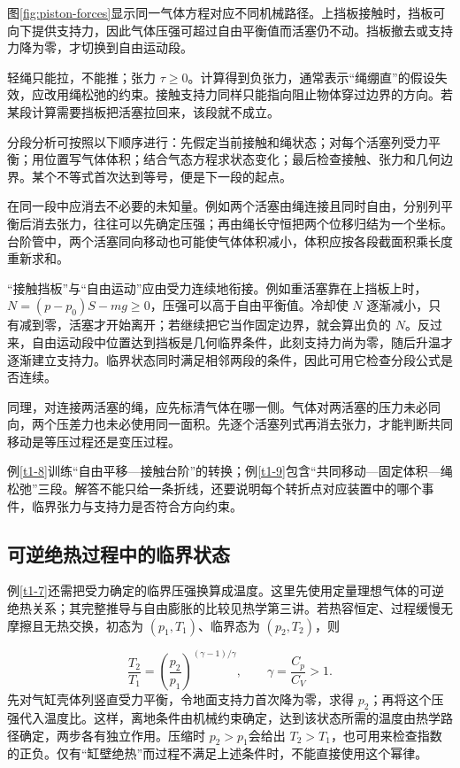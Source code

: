 图\ref{fig:piston-forces}显示同一气体方程对应不同机械路径。上挡板接触时，挡板可向下提供支持力，因此气体压强可超过自由平衡值而活塞仍不动。挡板撤去或支持力降为零，才切换到自由运动段。


轻绳只能拉，不能推；张力 $\tau\ge0$。计算得到负张力，通常表示“绳绷直”的假设失效，应改用绳松弛的约束。接触支持力同样只能指向阻止物体穿过边界的方向。若某段计算需要挡板把活塞拉回来，该段就不成立。

分段分析可按照以下顺序进行：先假定当前接触和绳状态；对每个活塞列受力平衡；用位置写气体体积；结合气态方程求状态变化；最后检查接触、张力和几何边界。某个不等式首次达到等号，便是下一段的起点。

在同一段中应消去不必要的未知量。例如两个活塞由绳连接且同时自由，分别列平衡后消去张力，往往可以先确定压强；再由绳长守恒把两个位移归结为一个坐标。台阶管中，两个活塞同向移动也可能使气体体积减小，体积应按各段截面积乘长度重新求和。

“接触挡板”与“自由运动”应由受力连续地衔接。例如重活塞靠在上挡板上时，$N=(p-p_0)S-mg\ge0$，压强可以高于自由平衡值。冷却使 $N$ 逐渐减小，只有减到零，活塞才开始离开；若继续把它当作固定边界，就会算出负的 $N$。反过来，自由运动段中位置达到挡板是几何临界条件，此刻支持力尚为零，随后升温才逐渐建立支持力。临界状态同时满足相邻两段的条件，因此可用它检查分段公式是否连续。

同理，对连接两活塞的绳，应先标清气体在哪一侧。气体对两活塞的压力未必同向，两个压差力也未必使用同一面积。先逐个活塞列式再消去张力，才能判断共同移动是等压过程还是变压过程。

例\ref{t1-8}训练“自由平移—接触台阶”的转换；例\ref{t1-9}包含“共同移动—固定体积—绳松弛”三段。解答不能只给一条折线，还要说明每个转折点对应装置中的哪个事件，临界张力与支持力是否符合方向约束。

\subsection{可逆绝热过程中的临界状态}
例\ref{t1-7}还需把受力确定的临界压强换算成温度。这里先使用定量理想气体的可逆绝热关系；其完整推导与自由膨胀的比较见热学第三讲。若热容恒定、过程缓慢无摩擦且无热交换，初态为 $(p_1,T_1)$、临界态为 $(p_2,T_2)$，则

\[
 \frac{T_2}{T_1}=\left(\frac{p_2}{p_1}\right)^{(\gamma-1)/\gamma},
 \qquad \gamma=\frac{C_p}{C_V}>1.
\]
先对气缸壳体列竖直受力平衡，令地面支持力首次降为零，求得 $p_2$；再将这个压强代入温度比。这样，离地条件由机械约束确定，达到该状态所需的温度由热学路径确定，两步各有独立作用。压缩时 $p_2>p_1$会给出 $T_2>T_1$，也可用来检查指数的正负。仅有“缸壁绝热”而过程不满足上述条件时，不能直接使用这个幂律。

